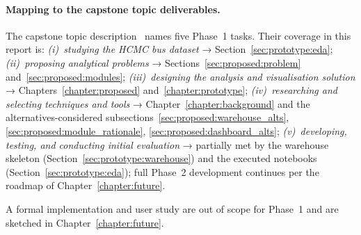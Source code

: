 \paragraph{Mapping to the capstone topic deliverables.}
The capstone topic description~\cite{capstoneDescription}
names five Phase~1 tasks. Their coverage in this report is:
\emph{(i)~studying the HCMC bus dataset} →
Section~\ref{sec:prototype:eda};
\emph{(ii)~proposing analytical problems} →
Sections~\ref{sec:proposed:problem}
and~\ref{sec:proposed:modules};
\emph{(iii)~designing the analysis and visualisation
solution} → Chapters~\ref{chapter:proposed}
and~\ref{chapter:prototype};
\emph{(iv)~researching and selecting techniques and tools} →
Chapter~\ref{chapter:background} and the alternatives-considered
subsections~\ref{sec:proposed:warehouse_alts},
\ref{sec:proposed:module_rationale},
\ref{sec:proposed:dashboard_alts};
\emph{(v)~developing, testing, and conducting initial
evaluation} → partially met by the warehouse skeleton
(Section~\ref{sec:prototype:warehouse}) and the executed
notebooks (Section~\ref{sec:prototype:eda}); full Phase~2
development continues per the roadmap of
Chapter~\ref{chapter:future}.

A formal implementation and user study are out of scope for
Phase~1 and are sketched in Chapter~\ref{chapter:future}.
